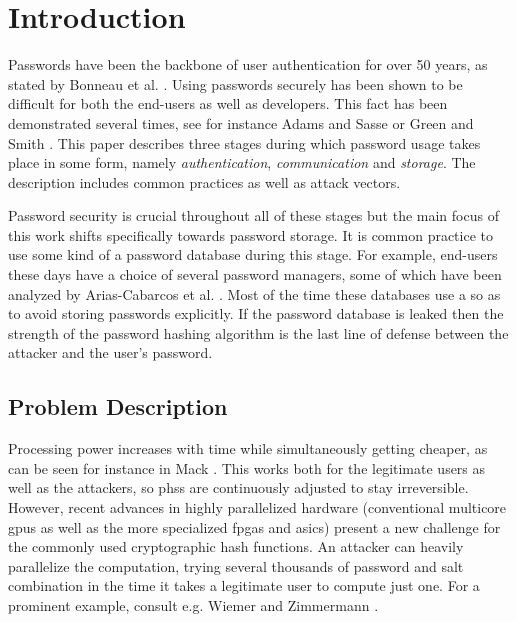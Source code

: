 \chapter{Introduction}
\label{sec:introduction}
Passwords have been the backbone of user authentication for over 50 years, as stated by Bonneau et al. \cite{bonneau:2015:passwords-and-evolution-of-auth}. Using passwords securely has been shown to be difficult for both the end-users as well as developers. This fact has been demonstrated several times, see for instance Adams and Sasse \cite{adams:1999:users-are-not-the-enemy} or Green and Smith \cite{green:2016:developers-are-not-the-enemy}. This paper describes three stages during which password usage takes place in some form, namely \emph{authentication}, \emph{communication} and \emph{storage}. The description includes common practices as well as attack vectors.

Password security is crucial throughout all of these stages but the main focus of this work shifts specifically towards password storage. It is common practice to use some kind of a password database during this stage. For example, end-users these days have a choice of several password managers, some of which have been analyzed by Arias-Cabarcos et al. \cite{arias:2016:comparing}. Most of the time these databases use a  so as to avoid storing passwords explicitly. If the password database is leaked then the strength of the password hashing algorithm is the last line of defense between the attacker and the user's password.

\section{Problem Description}
Processing power increases with time while simultaneously getting cheaper, as can be seen for instance in Mack \cite{mack:2015:the-multiple-lives-of-moores-law}. This works both for the legitimate users as well as the attackers, so \glspl{phs} are continuously adjusted to stay irreversible. However, recent advances in highly parallelized hardware (conventional multicore \glspl{gpu} as well as the more specialized \glspl{fpga} and \glspl{asic}) present a new challenge for the commonly used cryptographic hash functions. An attacker can heavily parallelize the computation, trying several thousands of password and salt combination in the time it takes a legitimate user to compute just one. For a prominent example, consult e.g. Wiemer and Zimmermann \cite{wiemer:2014:high-speed-bcrypt}.

